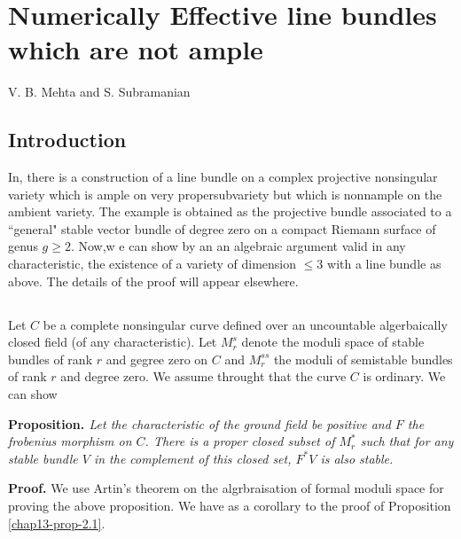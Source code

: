 \chapter{Numerically Effective line bundles which are not ample}\label{chap13}

\begin{center}
V. B. Mehta and S. Subramanian
\end{center}


\setcounter{pageoriginal}{268}
\section{Introduction}\label{chap13-sec-1}
In\pageoriginale \cite{chap13-key6}, there is a construction of a line bundle on a complex projective nonsingular variety which is ample on very propersubvariety but which is nonnample on the ambient variety. The example is obtained as the projective bundle associated to a ``general" stable vector bundle of degree zero on a compact Riemann surface of genus $g \geq 2$. Now,w e can show by an an algebraic argument valid in any characteristic, the existence of a variety of dimension $\leq 3$ with a line bundle as above. The details of the proof will appear elsewhere.

\section{}\label{chap13-sec-2}
Let $C$ be a complete  nonsingular curve defined over an uncountable algerbaically closed field (of any characteristic). Let $M_{r}^{s}$ denote the moduli space of stable bundles of rank $r$ and gegree zero on $C$ and $M_{r}^{ss}$ the moduli of semistable bundles of rank $r$ and degree zero. We assume throught that the curve $C$ is ordinary. We can show

\medskip
\noindent
{\bfseries {} Proposition. \label{chap13-prop-2.1}} \textit{Let the characteristic of the ground field be positive and $F$ the frobenius morphism on $C$. There is a proper closed subset of $M_{r}^{*}$ such that for any stable bundle $V$ in the complement of this closed set, $F^{*}V$ is also stable.}

\medskip
\noindent
{\bfseries Proof.} We use Artin's theorem on the algrbraisation of formal moduli space for proving the above proposition. We have as a corollary to the proof of Proposition \eqref{chap13-prop-2.1}.


